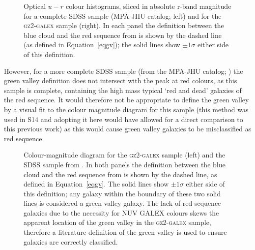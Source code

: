 \begin{figure}
\caption[Optical $u-r$ colour histograms in absolute r-band magnitude slices of the \textsc{gz2-galex} and Baldry et al. (2004) complete SDSS samples]{Optical $u-r$ colour histograms, sliced in absolute r-band magnitude for a complete SDSS sample (MPA-JHU catalog; left) and for the \textsc{gz2-galex} sample (right). In each panel the definition between the blue cloud and the red sequence from \citet{Baldry04} is shown by the dashed line (as defined in Equation~\ref{eqgv}); the solid lines show $\pm 1\sigma$ either side of this definition.}
\label{fig:cmgvsplit}
\end{figure}

However, for a more complete SDSS sample (from the MPA-JHU catalog; \citealt[][left panels of Figure~\ref{fig:cmgvsplit}]{kauffmann03, brinchmann04}) the \citet{Baldry04} green valley definition does not intersect with the peak at red colours, as this sample is complete, containing the high mass typical `red and dead' galaxies of the red sequence. It would therefore not be appropriate to define the green valley by a visual fit to the colour magnitude diagram for this sample (this method was used in S14 and adopting it here would have allowed for a direct comparison to this previous work) as this would cause green valley galaxies to be misclassified as red sequence.

\begin{figure}
\caption[Colour-magnitude diagram showing the location of the Baldry et al. (2004) green valley definition]{Colour-magnitude diagram for the \textsc{gz2-galex} sample (left) and the SDSS sample from \citet[][right]{Baldry04}. In both panels the definition between the blue cloud and the red sequence from \citet{Baldry04} is shown by the dashed line, as defined in Equation~\ref{eqgv}. The solid lines show $\pm 1\sigma$ either side of this definition; any galaxy within the boundary of these two solid lines is considered a green valley galaxy. The lack of red sequence galaxies due to the necessity for NUV GALEX colours skews the apparent location of the green valley in the \textsc{gz2-galex} sample, therefore a literature definition of the green valley is used to ensure galaxies are correctly classified.}
\label{fig:CMGV}
\end{figure}

